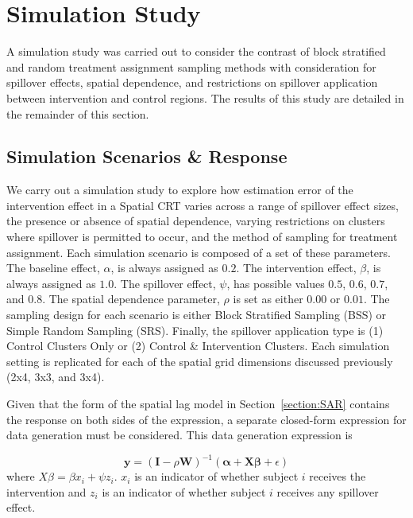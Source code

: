 \documentclass{article}[11pt]
\begin{document}
\section{Simulation Study}\label{section:Results}

A simulation study was carried out to consider the contrast of block stratified and random treatment assignment sampling methods with consideration for spillover effects, spatial dependence, and restrictions on spillover application between intervention and control regions. The results of this study are detailed in the remainder of this section.

\subsection{Simulation Scenarios \& Response}

We carry out a simulation study to explore how estimation error of the intervention effect in a Spatial CRT varies across a range of spillover effect sizes, the presence or absence of spatial dependence, varying restrictions on clusters where spillover is permitted to occur, and the method of sampling for treatment assignment. Each simulation scenario is composed of a set of these parameters. The baseline effect, $\alpha$, is always assigned as $0.2$. The intervention effect, $\beta$, is always assigned as $1.0$. The spillover effect, $\psi$, has possible values $0.5$, $0.6$, $0.7$, and $0.8$. The spatial dependence parameter, $\rho$ is set as either $0.00$ or $0.01$. The sampling design for each scenario is either Block Stratified Sampling (BSS) or Simple Random Sampling (SRS). Finally, the spillover application type is (1) Control Clusters Only or (2) Control \& Intervention Clusters. Each simulation setting is replicated for each of the spatial grid dimensions discussed previously (2x4, 3x3, and 3x4).

Given that the form of the spatial lag model in Section~\ref{section:SAR} contains the response on both sides of the expression, a separate closed-form expression for data generation must be considered\cite{fotheringham_sage_2009}\cite{baltagi_spatial_2003}. This data generation expression is

\begin{equation}\label{Equation:DataGen}
    \mathbf{y} = \left(\mathbf{I}-\rho \mathbf{W}\right)^{-1}\left(\boldsymbol\alpha + \mathbf{X}\boldsymbol\beta + \epsilon\right)
\end{equation}
where $X\beta = \beta x_i + \psi z_i$. $x_i$ is an indicator of whether subject $i$ receives the intervention and $z_i$ is an indicator of whether subject $i$ receives any spillover effect.
\end{document}
